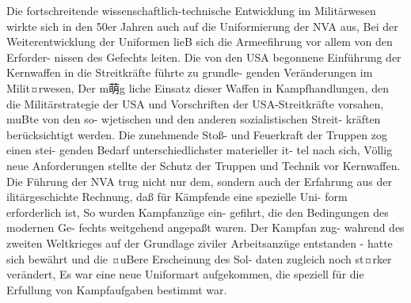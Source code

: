 

Die fortschreitende wissenschaftlich-technische
Entwicklung im Militärwesen wirkte sich in den
50er Jahren auch auf die Uniformierung der NVA
aus, Bei der Weiterentwicklung der Uniformen lieB
sich die Armeefihrung vor allem von den Erforder-
nissen des Gefechts leiten.
Die von den USA begonnene Einführung der
Kernwaffen in die Streitkräfte führte zu grundle-
genden Veränderungen im Milit¤rwesen, Der m萌g
liche Einsatz dieser Waffen in Kampfhandlungen,
den die Militärstrategie der USA und Vorschriften
der USA-Streitkräfte vorsahen, muBte von den so-
wjetischen und den anderen sozialistischen Streit-
kräften berücksichtigt werden. Die zunehmende
Stoß- und Feuerkraft der Truppen zog einen stei-
genden Bedarf unterschiedlichster materieller it-
tel nach sich, Völlig neue Anforderungen stellte der Schutz der Truppen und Technik vor Kernwaffen.
Die Führung der NVA trug nicht nur dem, sondern
auch der Erfahrung aus der ilitärgeschichte
Rechnung, daß für Kämpfende eine spezielle Uni-
form erforderlich ist, So wurden Kampfanzüge ein-
gefihrt, die den Bedingungen des modernen Ge-
fechts weitgehend angepaßt waren. Der Kampfan
zug- wahrend des zweiten Weltkrieges auf der
Grundlage ziviler Arbeitsanzüge entstanden - hatte
sich bewährt und die ¤uBere Erscheinung des Sol-
daten zugleich noch st¤rker verändert, Es war eine
neue Uniformart aufgekommen, die speziell für die
Erfullung von Kampfaufgaben bestimmt war.

